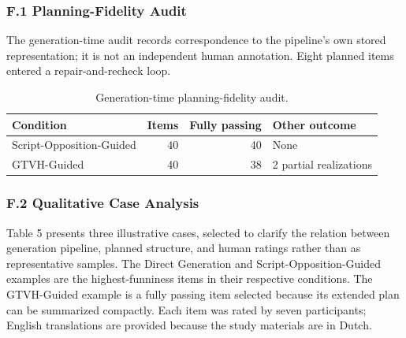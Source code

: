 \documentclass[11pt]{article}
\begin{document}
\subsubsection{F.1 Planning-Fidelity Audit}\label{f1-planning-fidelity-audit}

The generation-time audit records correspondence to the pipeline's own stored representation; it is not an independent human annotation. Eight planned items entered a repair-and-recheck loop.

\begin{table}[t]\centering\scriptsize
\begin{tabular}{lrrl}
\toprule
Condition & Items & Fully passing & Other outcome \\
\midrule
Script-Opposition-Guided & 40 & 40 & None \\
GTVH-Guided & 40 & 38 & 2 partial realizations \\
\bottomrule
\end{tabular}
\caption{Generation-time planning-fidelity audit.}\label{tab:fidelity-audit}
\end{table}

\subsubsection{F.2 Qualitative Case Analysis}\label{f2-qualitative-case-analysis}

Table 5 presents three illustrative cases, selected to clarify the relation between generation pipeline, planned structure, and human ratings rather than as representative samples. The Direct Generation and Script-Opposition-Guided examples are the highest-funniness items in their respective conditions. The GTVH-Guided example is a fully passing item selected because its extended plan can be summarized compactly. Each item was rated by seven participants; English translations are provided because the study materials are in Dutch.
\end{document}
